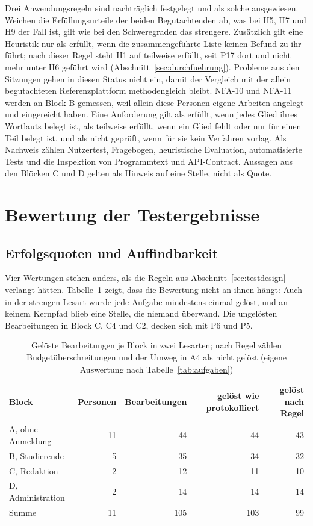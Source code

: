Drei Anwendungsregeln sind nachträglich festgelegt und als solche ausgewiesen. Weichen die Erfüllungsurteile der beiden Begutachtenden ab, was bei H5, H7 und H9 der Fall ist, gilt wie bei den Schweregraden das strengere. Zusätzlich gilt eine Heuristik nur als erfüllt, wenn die zusammengeführte Liste keinen Befund zu ihr führt; nach dieser Regel steht H1 auf teilweise erfüllt, seit P17 dort und nicht mehr unter H6 geführt wird (Abschnitt~\ref{sec:durchfuehrung}). Probleme aus den Sitzungen gehen in diesen Status nicht ein, damit der Vergleich mit der allein begutachteten Referenzplattform methodengleich bleibt. NFA-10 und NFA-11 werden an Block B gemessen, weil allein diese Personen eigene Arbeiten angelegt und eingereicht haben. Eine Anforderung gilt als erfüllt, wenn jedes Glied ihres Wortlauts belegt ist, als teilweise erfüllt, wenn ein Glied fehlt oder nur für einen Teil belegt ist, und als nicht geprüft, wenn für sie kein Verfahren vorlag. Als Nachweis zählen Nutzertest, Fragebogen, heuristische Evaluation, automatisierte Tests und die Inspektion von Programmtext und API-Contract. Aussagen aus den Blöcken C und D gelten als Hinweis auf eine Stelle, nicht als Quote.

\section{Bewertung der Testergebnisse}
\label{sec:bewertung-test}

\subsection{Erfolgsquoten und Auffindbarkeit}
\label{subsec:erfolg-auffindbarkeit}

Vier Wertungen stehen anders, als die Regeln aus Abschnitt~\ref{sec:testdesign} verlangt hätten. Tabelle~\ref{tab:lesarten} zeigt, dass die Bewertung nicht an ihnen hängt: Auch in der strengen Lesart wurde jede Aufgabe mindestens einmal gelöst, und an keinem Kernpfad blieb eine Stelle, die niemand überwand. Die ungelösten Bearbeitungen in Block C, C4 und C2, decken sich mit P6 und P5.

\begin{table}[htbp]
	\centering
	\footnotesize
	\caption[Gelöste Bearbeitungen je Block in zwei Lesarten]{Gelöste Bearbeitungen je Block in zwei Lesarten; nach Regel zählen Budgetüberschreitungen und der Umweg in A4 als nicht gelöst (eigene Auswertung nach Tabelle~\ref{tab:aufgaben})}
	\label{tab:lesarten}
	\begin{tabular}{@{}lrrrr@{}}
		\toprule
		\textbf{Block} & \textbf{Personen} & \textbf{Bearbeitungen} & \textbf{gelöst wie protokolliert} & \textbf{gelöst nach Regel} \\
		\midrule
		A, ohne Anmeldung & 11 & 44 & 44 & 43 \\
		B, Studierende & 5 & 35 & 34 & 32 \\
		C, Redaktion & 2 & 12 & 11 & 10 \\
		D, Administration & 2 & 14 & 14 & 14 \\
		\midrule
		Summe & 11 & 105 & 103 & 99 \\
		\bottomrule
	\end{tabular}
\end{table}

